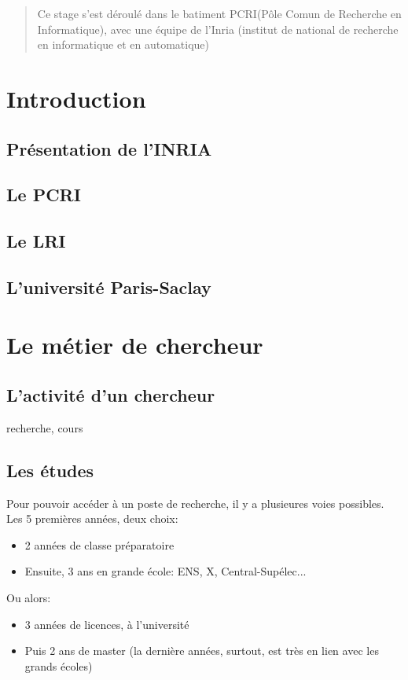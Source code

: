 \documentclass{article}
\begin{document}
\begin{abstract}
Ce stage s'est déroulé dans le batiment PCRI(Pôle Comun de Recherche en Informatique), avec une équipe de l'Inria (institut de national de recherche en informatique et en automatique)
\end{abstract}

\section{Introduction}\label{sec:intro}

\subsection{Présentation de l'INRIA}
\subsection{Le PCRI}
\subsection{Le LRI} %
\subsection{L'université Paris-Saclay}

\section{Le métier de chercheur}

\subsection{L'activité d'un chercheur}
recherche, cours

\subsection{Les études}

Pour pouvoir accéder à un poste de recherche, il y a plusieures voies possibles. Les 5 premières années, deux choix:
\begin{itemize}
	\item 2 années de classe préparatoire
	\item Ensuite, 3 ans en grande école: ENS, X, Central-Supélec...
\end{itemize}
Ou alors:
\begin{itemize}
	\item3 années de licences, à l'université
	\item Puis 2 ans de master (la dernière années, surtout, est très en lien avec les grands écoles)
\end{itemize}
\end{document}
